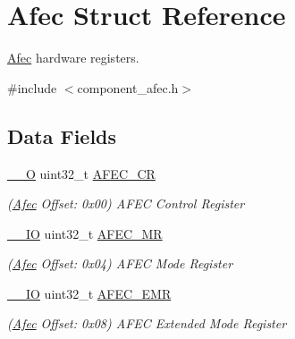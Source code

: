 \hypertarget{structAfec}{}\section{Afec Struct Reference}
\label{structAfec}


\mbox{\hyperlink{structAfec}{Afec}} hardware registers.  




{\ttfamily \#include $<$component\+\_\+afec.\+h$>$}

\subsection*{Data Fields}
\begin{DoxyCompactItemize}
\item 
\mbox{\label{structAfec_ac29b1d3db73de4b64488f7ee7963156f}} 
\mbox{\hyperlink{core__cm7_8h_a7e25d9380f9ef903923964322e71f2f6}{\+\_\+\+\_\+O}} uint32\+\_\+t \mbox{\hyperlink{structAfec_ac29b1d3db73de4b64488f7ee7963156f}{A\+F\+E\+C\+\_\+\+CR}}
\begin{DoxyCompactList}\small\item\em (\mbox{\hyperlink{structAfec}{Afec}} Offset\+: 0x00) A\+F\+EC Control Register \end{DoxyCompactList}\item 
\mbox{\label{structAfec_acec338750aa7f92bbc3da2a095330ba1}} 
\mbox{\hyperlink{core__cm7_8h_aec43007d9998a0a0e01faede4133d6be}{\+\_\+\+\_\+\+IO}} uint32\+\_\+t \mbox{\hyperlink{structAfec_acec338750aa7f92bbc3da2a095330ba1}{A\+F\+E\+C\+\_\+\+MR}}
\begin{DoxyCompactList}\small\item\em (\mbox{\hyperlink{structAfec}{Afec}} Offset\+: 0x04) A\+F\+EC Mode Register \end{DoxyCompactList}\item 
\mbox{\label{structAfec_a273bb4498b610cbe4cbe26a6824a0763}} 
\mbox{\hyperlink{core__cm7_8h_aec43007d9998a0a0e01faede4133d6be}{\+\_\+\+\_\+\+IO}} uint32\+\_\+t \mbox{\hyperlink{structAfec_a273bb4498b610cbe4cbe26a6824a0763}{A\+F\+E\+C\+\_\+\+E\+MR}}
\begin{DoxyCompactList}\small\item\em (\mbox{\hyperlink{structAfec}{Afec}} Offset\+: 0x08) A\+F\+EC Extended Mode Register \end{DoxyCompactList}\item 

\end{DoxyCompactItemize}
